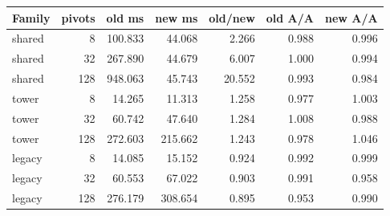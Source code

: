 \begin{center}\small
\begin{tabular}{@{}lrrrrrr@{}}
\toprule
Family & pivots & old ms & new ms & old/new & old A/A & new A/A \\
\midrule
shared & 8 & 100.833 & 44.068 & 2.266 & 0.988 & 0.996 \\
shared & 32 & 267.890 & 44.679 & 6.007 & 1.000 & 0.994 \\
shared & 128 & 948.063 & 45.743 & 20.552 & 0.993 & 0.984 \\
tower & 8 & 14.265 & 11.313 & 1.258 & 0.977 & 1.003 \\
tower & 32 & 60.742 & 47.640 & 1.284 & 1.008 & 0.988 \\
tower & 128 & 272.603 & 215.662 & 1.243 & 0.978 & 1.046 \\
legacy & 8 & 14.085 & 15.152 & 0.924 & 0.992 & 0.999 \\
legacy & 32 & 60.553 & 67.022 & 0.903 & 0.991 & 0.958 \\
legacy & 128 & 276.179 & 308.654 & 0.895 & 0.953 & 0.990 \\
\bottomrule
\end{tabular}
\end{center}
